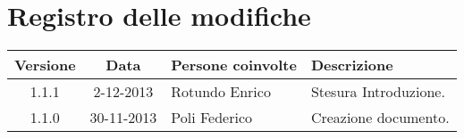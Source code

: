 \section*{Registro delle modifiche}

\begin{tabularx}{\textwidth}{|c|c|p{3.5cm}|X|}
 \hline \textbf{Versione} & \textbf{Data} & \textbf{Persone coinvolte} & \textbf{Descrizione} \\
 \hline 1.1.1 & 2-12-2013 & Rotundo Enrico & Stesura Introduzione. \\
 \hline 1.1.0 & 30-11-2013 & Poli Federico & Creazione documento.\\
 \hline
\end{tabularx}
